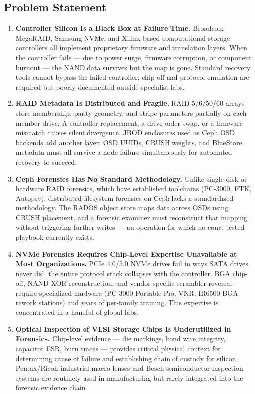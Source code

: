\documentclass[11pt,letterpaper]{article}
\begin{document}
\subsection{Problem Statement}

\begin{enumerate}[leftmargin=*]
  \item \textbf{Controller Silicon Is a Black Box at Failure Time.} Broadcom MegaRAID, Samsung NVMe, and Xilinx-based computational storage controllers all implement proprietary firmware and translation layers. When the controller fails --- due to power surge, firmware corruption, or component burnout --- the NAND data survives but the map is gone. Standard recovery tools cannot bypass the failed controller; chip-off and protocol emulation are required but poorly documented outside specialist labs.

  \item \textbf{RAID Metadata Is Distributed and Fragile.} RAID 5/6/50/60 arrays store membership, parity geometry, and stripe parameters partially on each member drive. A controller replacement, a drive-order swap, or a firmware mismatch causes silent divergence. JBOD enclosures used as Ceph OSD backends add another layer: OSD UUIDs, CRUSH weights, and BlueStore metadata must all survive a node failure simultaneously for automated recovery to succeed.

  \item \textbf{Ceph Forensics Has No Standard Methodology.} Unlike single-disk or hardware RAID forensics, which have established toolchains (PC-3000, FTK, Autopsy), distributed filesystem forensics on Ceph lacks a standardized methodology. The RADOS object store maps data across OSDs using CRUSH placement, and a forensic examiner must reconstruct that mapping without triggering further writes --- an operation for which no court-tested playbook currently exists.

  \item \textbf{NVMe Forensics Requires Chip-Level Expertise Unavailable at Most Organizations.} PCIe 4.0/5.0 NVMe drives fail in ways SATA drives never did: the entire protocol stack collapses with the controller. BGA chip-off, NAND XOR reconstruction, and vendor-specific scrambler reversal require specialized hardware (PC-3000 Portable Pro, VNR, IR6500 BGA rework stations) and years of per-family training. This expertise is concentrated in a handful of global labs.

  \item \textbf{Optical Inspection of VLSI Storage Chips Is Underutilized in Forensics.} Chip-level evidence --- die markings, bond wire integrity, capacitor ESR, burn traces --- provides critical physical context for determining cause of failure and establishing chain of custody for silicon. Pentax/Ricoh industrial macro lenses and Bosch semiconductor inspection systems are routinely used in manufacturing but rarely integrated into the forensic evidence chain.
\end{enumerate}
\end{document}
